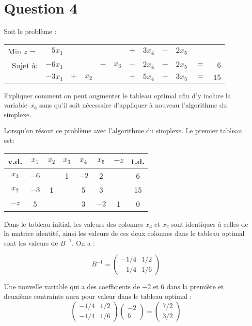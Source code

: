 \section*{Question 4}
\begin{em}
Soit le problème :

\begin{tabular}{@{}rrrrrrrrrrrr@{}}
	Min $z =$ &  $5x_1$ &     &       &     &       & $+$ & $3x_4$ & $-$ & $2x_5$ &     &    \\
	 Sujet à: & $-6x_1$ &     &       & $+$ & $x_3$ & $-$ & $2x_4$ & $+$ & $2x_5$ & $=$ &  $6$ \\
	          & $-3x_1$ & $+$ & $x_2$ &     &       & $+$ & $5x_4$ & $+$ & $3x_5$ & $=$ & $15$
\end{tabular}

Expliquer comment on peut augmenter le tableau optimal afin d’y inclure la variable~$x_6$ sans qu’il soit nécessaire d’appliquer à nouveau l’algorithme du simplexe.
\end{em}

Lorsqu’on résout ce problème avec l’algorithme du simplexe. Le premier tableau est:

\begin{center}
	\renewcommand{\arraystretch}{1.5}
	\begin{tabular}{|c|cccccc|c|}
		\hline
		 v.d.   & $x_{1}$ & $x_{2}$ & $x_{3}$ & $x_{4}$ & $x_{5}$ & $-z$ & t.d. \\ \hline
		$x_{3}$ &  $-6$   &         &    1    &  $-2$   &    2    &      &  6   \\
		$x_{2}$ &  $-3$   &    1    &         &    5    &    3    &      &  15  \\ \hline
		 $-z$   &    5    &         &         &    3    &  $-2$   &  1   &  0   \\ \hline
	\end{tabular}
\end{center}

Dans le tableau initial, les valeurs des colonnes $x_3$ et $x_2$ sont identiques à celles de la matrice identité, ainsi les valeurs de ces deux colonnes dans le tableau optimal sont les valeurs de $B^{-1}$. On a :

\[
B^{-1} = 
\begin{pmatrix}
	-1/4 & 1/2 \\
	-1/4 & 1/6
\end{pmatrix}
\]

Une nouvelle variable qui a des coefficients de $-2$ et 6 dans la première et deuxième contrainte aura pour valeur dans le tableau optimal :
\[
\begin{pmatrix}
	-1/4 & 1/2 \\
	-1/4 & 1/6
\end{pmatrix}
\begin{pmatrix}
	-2 \\
	6
\end{pmatrix}
=
\begin{pmatrix}
	7/2 \\
	3/2
\end{pmatrix}
\]

